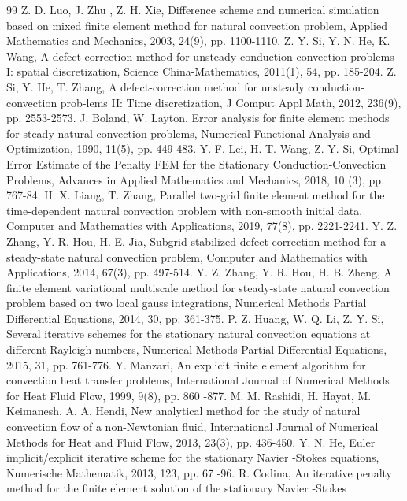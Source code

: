 \documentclass[10pt]{article}
\begin{document}
\begin{thebibliography}{99}
		    Z. D. Luo, J. Zhu , Z. H. Xie,  Difference scheme and numerical simulation based on mixed finite element method for natural convection problem, Applied Mathematics and Mechanics, 2003, 24(9), pp. 1100-1110.
		Z. Y. Si, Y. N. He, K. Wang, A defect-correction method for unsteady conduction convection problems I: spatial discretization, Science China-Mathematics, 2011(1), 54, pp. 185-204.
		 Z. Si, Y. He, T. Zhang, A defect-correction method for unsteady conduction-convection prob-lems II: Time discretization, J Comput Appl Math, 2012, 236(9), pp. 2553-2573.
		  J. Boland, W. Layton, Error analysis for finite element methods for steady natural convection problems, Numerical Functional Analysis and Optimization, 1990, 11(5), pp. 449-483.
		 Y. F. Lei, H. T. Wang, Z. Y. Si, Optimal Error Estimate of the Penalty FEM for the Stationary Conduction-Convection Problems, Advances in Applied Mathematics and Mechanics, 2018, 10 (3), pp. 767-84.
		   H. X. Liang, T. Zhang, Parallel two-grid finite element method for the time-dependent natural convection problem with non-smooth initial data, Computer and Mathematics with Applications, 2019, 77(8), pp. 2221-2241.
		 Y. Z. Zhang, Y. R. Hou, H. E. Jia, Subgrid stabilized defect-correction method for a steady-state natural
		convection problem, Computer and Mathematics with Applications, 2014, 67(3), pp. 497-514.
		Y. Z. Zhang, Y. R. Hou, H. B. Zheng, A finite element variational multiscale method for steady-state natural convection problem based on two local gauss integrations, Numerical Methods Partial Differential Equations, 2014, 30, pp. 361-375.
		 P. Z. Huang, W. Q. Li, Z. Y. Si, Several iterative schemes for the stationary natural convection equations at different Rayleigh numbers, Numerical Methods Partial Differential Equations, 2015, 31, pp. 761-776.
		 Y. Manzari, An explicit finite element algorithm for convection heat transfer problems, International Journal of Numerical Methods for Heat Fluid Flow, 1999, 9(8), pp. 860 -877.
		  M. M. Rashidi, H. Hayat, M. Keimanesh, A. A. Hendi, New analytical method for the study of natural convection flow of a non-Newtonian fluid, International Journal of Numerical Methods for Heat and Fluid Flow, 2013, 23(3), pp. 436-450.
		 Y. N. He, Euler implicit/explicit iterative scheme for the stationary Navier -Stokes equations, Numerische Mathematik, 2013, 123, pp. 67 -96.
		 R. Codina, An iterative penalty method for the finite element solution of the stationary Navier -Stokes

\end{thebibliography}
\end{document}
